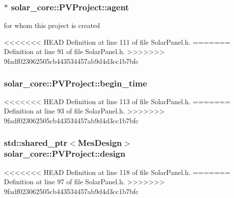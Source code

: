 \subsubsection[{agent}]{$\ast$ solar\+\_\+core\+::\+P\+V\+Project\+::agent}\label{classsolar__core_1_1_p_v_project_a20e8115154979d2f856f1acceb6bb2b1}
for whom this project is created 

<<<<<<< HEAD
Definition at line 111 of file Solar\+Panel.\+h.
=======
Definition at line 91 of file Solar\+Panel.\+h.
>>>>>>> 9fadf023062505cb443534457ab9d4d3cc1b7bfc

\hypertarget{classsolar__core_1_1_p_v_project_a5b8869c2a2580e5183a7796580074555}{}
\subsubsection[{begin\+\_\+time}]{ solar\+\_\+core\+::\+P\+V\+Project\+::begin\+\_\+time}\label{classsolar__core_1_1_p_v_project_a5b8869c2a2580e5183a7796580074555}


<<<<<<< HEAD
Definition at line 113 of file Solar\+Panel.\+h.
=======
Definition at line 93 of file Solar\+Panel.\+h.
>>>>>>> 9fadf023062505cb443534457ab9d4d3cc1b7bfc

\hypertarget{classsolar__core_1_1_p_v_project_a0e3e8228c8129ccd07e44503ef8577a8}{}
\subsubsection[{design}]{\setlength{\rightskip}{0pt plus 5cm}std\+::shared\+\_\+ptr$<${\bf Mes\+Design}$>$ solar\+\_\+core\+::\+P\+V\+Project\+::design}\label{classsolar__core_1_1_p_v_project_a0e3e8228c8129ccd07e44503ef8577a8}


<<<<<<< HEAD
Definition at line 118 of file Solar\+Panel.\+h.
=======
Definition at line 97 of file Solar\+Panel.\+h.
>>>>>>> 9fadf023062505cb443534457ab9d4d3cc1b7bfc

\hypertarget{classsolar__core_1_1_p_v_project_adf809769d8d38859f2f766fb5332b946}{}
